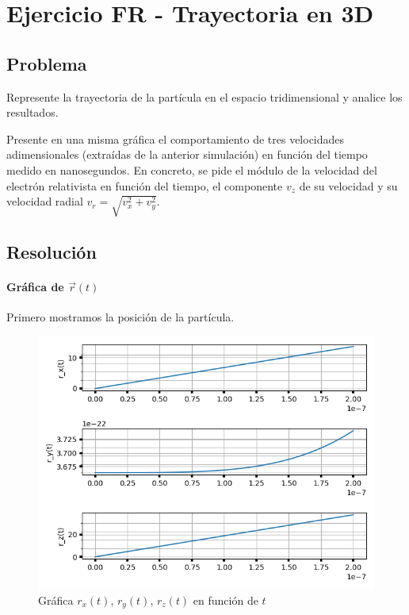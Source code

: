 \section{Ejercicio FR - Trayectoria en 3D}

\subsection{Problema}

Represente la trayectoria de la partícula en el espacio tridimensional y analice los resultados.

Presente en una misma gráfica el comportamiento de tres velocidades adimensionales (extraídas de la anterior simulación) en función del tiempo medido en nanosegundos. En concreto, se pide el módulo de la velocidad del electrón relativista en función del tiempo, el componente $v_z$ de su velocidad y su velocidad radial $v_r = \sqrt{ v_x^2 + v_y^2}$. 

\subsection{Resolución}

\paragraph{Gráfica de $\vec{r}(t)$} 
Primero mostramos la posición de la partícula.

\begin{figure}[H]
	\includegraphics[width=\linewidth]{figures/rel_rx_ry_rz.png}
	\caption{Gráfica $r_x(t)$, $r_y(t)$, $r_z(t)$ en función de $t$}
	\label{fig:rel_rx_ry_rz_t}
\end{figure}

